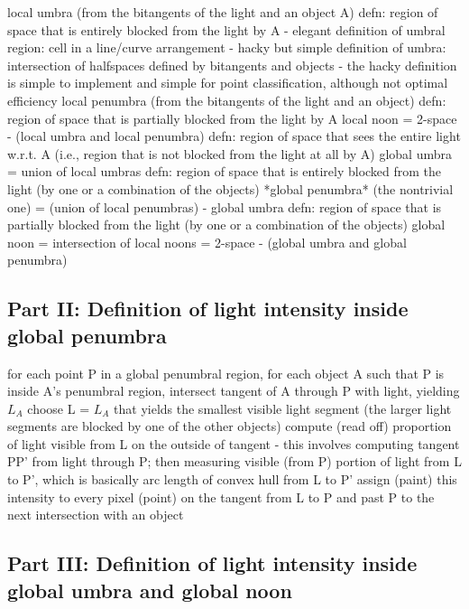 \documentclass[9pt,twocolumn]{article}
\begin{document}
local umbra 
	(from the bitangents of the light and an object A)
	defn: region of space that is entirely blocked from the light by A
	- elegant definition of umbral region: cell in a line/curve arrangement
	- hacky but simple definition of umbra: intersection of halfspaces defined
		by bitangents and objects
	- the hacky definition is simple to implement and simple for point 
		classification, although not optimal efficiency
local penumbra 
	(from the bitangents of the light and an object)
	defn: region of space that is partially blocked from the light by A
local noon
	= 2-space - (local umbra and local penumbra)
	defn: region of space that sees the entire light w.r.t. A
		(i.e., region that is not blocked from the light at all by A)
global umbra 
	= union of local umbras
	defn: region of space that is entirely blocked from the light 
	      (by one or a combination of the objects)
*global penumbra*	(the nontrivial one)
	= (union of local penumbras) - global umbra
	defn: region of space that is partially blocked from the light 
	      (by one or a combination of the objects)
global noon
	= intersection of local noons
	= 2-space - (global umbra and global penumbra)
	
			
\subsection{Part II: Definition of light intensity inside global penumbra}

for each point P in a global penumbral region,
  for each object A such that P is inside A's penumbral region,
	intersect tangent of A through P with light, yielding $L_A$
  choose L = $L_A$ that yields the smallest visible light segment
	(the larger light segments are blocked by one of the other objects)
  compute (read off) proportion of light visible from L on the
	outside of tangent
	   - this involves computing tangent PP' from light 
	     through P; then measuring visible (from P) portion of 
	     light from L to P', which is basically arc length
	     of convex hull from L to P'
  assign (paint) this intensity to every pixel (point) on 
	     the tangent from L to P and past P to the next 
	     intersection with an object

			
\subsection{Part III: Definition of light intensity inside global umbra and global noon}
\end{document}
